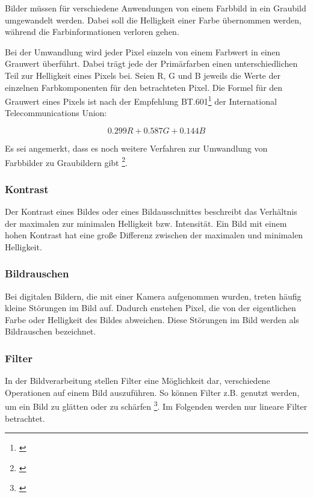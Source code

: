 Bilder müssen für verschiedene Anwendungen von einem Farbbild in ein Graubild umgewandelt werden. Dabei soll die Helligkeit einer Farbe übernommen werden, während die Farbinformationen verloren gehen.

Bei der Umwandlung wird jeder Pixel einzeln von einem Farbwert in einen Grauwert überführt.
Dabei trägt jede der Primärfarben einen unterschiedlichen Teil zur Helligkeit eines Pixels bei.
Seien R, G und B jeweils die Werte der einzelnen Farbkomponenten für den betrachteten Pixel.
Die Formel für den Grauwert eines Pixels ist nach der Empfehlung BT.601\footnote{\cite[S. 3]{international2007studio}} der International Telecommunications Union:

\[
0.299R +  0.587G + 0.144B
\] 

Es sei angemerkt, dass es noch weitere Verfahren zur Umwandlung von Farbbilder zu Graubildern gibt \footnote{\cite[S. 4]{international2002parameter}}.

\subsubsection{Kontrast}
\label{sec:kontrast}

Der Kontrast eines Bildes oder eines Bildausschnittes beschreibt das Verhältnis der maximalen zur minimalen Helligkeit bzw. Intensität. Ein Bild mit einem hohen Kontrast hat eine große Differenz zwischen der maximalen und minimalen Helligkeit.

\subsubsection{Bildrauschen}
\label{sec:rauschen}

Bei digitalen Bildern, die mit einer Kamera aufgenommen wurden, treten häufig kleine Störungen im Bild auf. Dadurch enstehen Pixel, die von der eigentlichen Farbe oder Helligkeit des Bildes abweichen. Diese Störungen im Bild werden als Bildrauschen bezeichnet. 


\subsubsection{Filter}

In der Bildverarbeitung stellen Filter eine Möglichkeit dar, verschiedene Operationen auf einem Bild auszuführen. So können Filter z.B. genutzt werden, um ein Bild zu glätten oder zu schärfen \footnote{\cite[S. 99f]{Burg06}}. Im Folgenden werden nur lineare Filter betrachtet.

